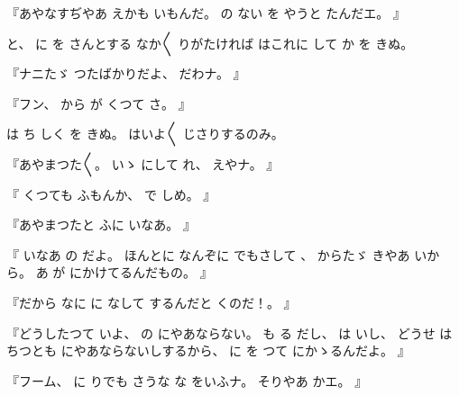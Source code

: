 %
『あやなすぢやあ
えかも
いもんだ。
%
の
ない
を
やうと
たんだエ。
』

%
と、
%
に
を
さんとする
なか〳〵
りがたければ
はこれに
して
か
を
きぬ。

%
『ナニたゞ
つたばかりだよ、
%
だわナ。
』

%
『フン、
%
から
が
くつて
さ。
』

%
は
ち
しく
を
きぬ。
%
はいよ〳〵
じさりするのみ。

%
『あやまつた〳〵。
%
いゝ
にして
れ、
%
えやナ。
』

%
『
くつても
ふもんか、
%
で
しめ。
』

%
『あやまつたと
ふに
いなあ。
』

%
『
いなあ
の
だよ。
%
ほんとに
なんぞに
でもさして
、
%
からたゞ
きやあ
いから。
%
あ
が
にかけてるんだもの。
』

%
『だから
なに
に
なして
するんだと
くのだ！。
』

%
『どうしたつて
いよ、
%
の
にやあならない。
%
も
る
だし、
%
は
いし、
%
どうせ
はちつとも
にやあならないしするから、
%
に
を
つて
にかゝるんだよ。
』

%
『フーム、
%
に
りでも
さうな
な
をいふナ。
%
そりやあ
かエ。
』


